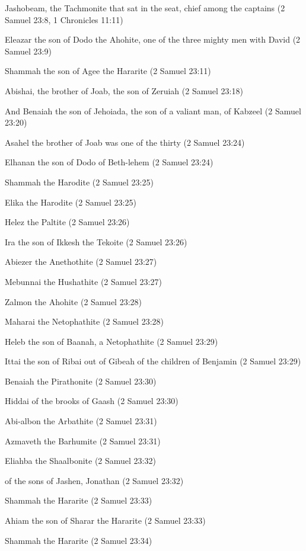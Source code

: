 \begin{compactenum}[1.]
	\item Jashobeam, the Tachmonite that sat in the seat, chief among the captains  (2 Samuel 23:8, 1 Chronicles 11:11)
	\item Eleazar the son of Dodo the Ahohite, one of the three mighty men with David (2 Samuel 23:9)
	\item Shammah the son of Agee the Hararite  (2 Samuel 23:11)
	\item Abishai, the brother of Joab, the son of Zeruiah  (2 Samuel 23:18)
	\item And Benaiah the son of Jehoiada, the son of a valiant man, of Kabzeel  (2 Samuel 23:20)
	\item Asahel the brother of Joab was one of the thirty (2 Samuel 23:24)
	\item Elhanan the son of Dodo of Beth-lehem (2 Samuel 23:24)
	\item Shammah the Harodite (2 Samuel 23:25)
	\item Elika the Harodite (2 Samuel 23:25)
	\item Helez the Paltite (2 Samuel 23:26)
	\item Ira the son of Ikkesh the Tekoite (2 Samuel 23:26)
	\item Abiezer the Anethothite (2 Samuel 23:27)
	\item Mebunnai the Hushathite (2 Samuel 23:27)
	\item Zalmon the Ahohite (2 Samuel 23:28)
	\item Maharai the Netophathite (2 Samuel 23:28)
	\item Heleb the son of Baanah, a Netophathite (2 Samuel 23:29)
	\item Ittai the son of Ribai out of Gibeah of the children of Benjamin (2 Samuel 23:29)
	\item Benaiah the Pirathonite (2 Samuel 23:30)
	\item Hiddai of the brooks of Gaash  (2 Samuel 23:30)
	\item Abi-albon the Arbathite (2 Samuel 23:31)
	\item Azmaveth the Barhumite (2 Samuel 23:31)
	\item Eliahba the Shaalbonite (2 Samuel 23:32)
	\item of the sons of Jashen, Jonathan (2 Samuel 23:32)
	\item Shammah the Hararite (2 Samuel 23:33)
	\item Ahiam the son of Sharar the Hararite (2 Samuel 23:33)
	\item Shammah the Hararite (2 Samuel 23:34)

\end{compactenum}
